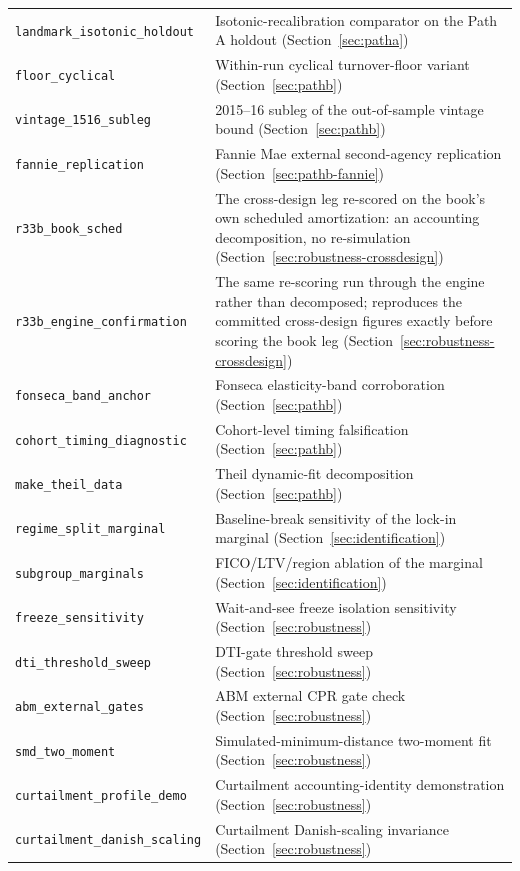 \documentclass[12pt]{article}
\begin{document}
\begin{table}[H]
\begin{threeparttable}
\begin{tabular}{@{}p{5.4cm}p{8.8cm}@{}}
\texttt{landmark\_isotonic\_holdout} & Isotonic-recalibration comparator on the Path A holdout (Section~\ref{sec:patha}) \\
\texttt{floor\_cyclical} & Within-run cyclical turnover-floor variant (Section~\ref{sec:pathb}) \\
\texttt{vintage\_1516\_subleg} & 2015--16 subleg of the out-of-sample vintage bound (Section~\ref{sec:pathb}) \\
\texttt{fannie\_replication} & Fannie Mae external second-agency replication (Section~\ref{sec:pathb-fannie}) \\
\texttt{r33b\_book\_sched} & The cross-design leg re-scored on the book's own scheduled amortization: an accounting decomposition, no re-simulation (Section~\ref{sec:robustness-crossdesign}) \\
\texttt{r33b\_engine\_confirmation} & The same re-scoring run through the engine rather than decomposed; reproduces the committed cross-design figures exactly before scoring the book leg (Section~\ref{sec:robustness-crossdesign}) \\
\texttt{fonseca\_band\_anchor} & Fonseca elasticity-band corroboration (Section~\ref{sec:pathb}) \\
\texttt{cohort\_timing\_diagnostic} & Cohort-level timing falsification (Section~\ref{sec:pathb}) \\
\texttt{make\_theil\_data} & Theil dynamic-fit decomposition (Section~\ref{sec:pathb}) \\
\texttt{regime\_split\_marginal} & Baseline-break sensitivity of the lock-in marginal (Section~\ref{sec:identification}) \\
\texttt{subgroup\_marginals} & FICO/LTV/region ablation of the marginal (Section~\ref{sec:identification}) \\
\texttt{freeze\_sensitivity} & Wait-and-see freeze isolation sensitivity (Section~\ref{sec:robustness}) \\
\texttt{dti\_threshold\_sweep} & DTI-gate threshold sweep (Section~\ref{sec:robustness}) \\
\texttt{abm\_external\_gates} & ABM external CPR gate check (Section~\ref{sec:robustness}) \\
\texttt{smd\_two\_moment} & Simulated-minimum-distance two-moment fit (Section~\ref{sec:robustness}) \\
\texttt{curtailment\_profile\_demo} & Curtailment accounting-identity demonstration (Section~\ref{sec:robustness}) \\
\texttt{curtailment\_danish\_scaling} & Curtailment Danish-scaling invariance (Section~\ref{sec:robustness}) \\

\end{tabular}
\end{threeparttable}
\end{table}
\end{document}
